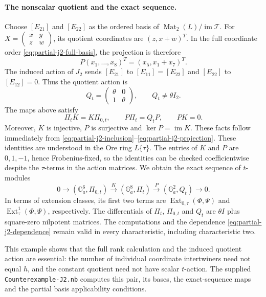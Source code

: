 \paragraph{The nonscalar quotient and the exact sequence.}
Choose $[E_{21}]$ and $[E_{22}]$ as the ordered basis of
$\operatorname{Mat}_2(L)/\operatorname{im}\mathcal T$.
For $X=\begin{pmatrix}x&y\\z&w\end{pmatrix}$, its quotient coordinates
are $(z,x+w)^T$. In the full coordinate order
\eqref{eq:partial-j2-full-basis}, the projection is therefore
\begin{equation}
 P(x_1,\ldots,x_8)^T=(x_5,x_1+x_7)^T.
 \label{eq:partial-j2-projection}
\end{equation}
The induced action of $J_2$ sends
$[E_{21}]$ to $[E_{11}]=[E_{22}]$ and $[E_{22}]$ to
$[E_{12}]=0$. Thus the quotient action is
\begin{equation}
 Q_t=\begin{pmatrix}\theta&0\\1&\theta\end{pmatrix},
 \qquad Q_t\neq\theta I_2.
 \label{eq:partial-j2-quotient}
\end{equation}
The maps above satisfy
\[
 \Pi_tK=K\Pi_{0,t},\qquad P\Pi_t=Q_tP,\qquad PK=0.
\]
Moreover, $K$ is injective, $P$ is surjective and $\ker P=\operatorname{im}K$.
These facts follow immediately from
\eqref{eq:partial-j2-inclusion}--\eqref{eq:partial-j2-projection}.
These identities are understood in the Ore ring $L\{\tau\}$.
The entries of $K$ and $P$ are $0,1,-1$, hence Frobenius-fixed, so the
identities can be checked coefficientwise despite the $\tau$-terms in the
action matrices.
We obtain the exact sequence of $t$-modules
\begin{equation}
 0\longrightarrow(\mathbb G_a^6,\Pi_{0,t})
 \xrightarrow{K}(\mathbb G_a^8,\Pi_t)
 \xrightarrow{P}(\mathbb G_a^2,Q_t)
 \longrightarrow0.
 \label{eq:partial-j2-exact-sequence}
\end{equation}
In terms of extension classes, its first two terms are
$\operatorname{Ext}_{0,\tau}(\Phi,\Psi)$ and
$\operatorname{Ext}^1_\tau(\Phi,\Psi)$, respectively.
The differentials of $\Pi_t$, $\Pi_{0,t}$ and $Q_t$ are $\theta I$
plus square-zero nilpotent matrices.
The computations and the dependence
\eqref{eq:partial-j2-dependence} remain valid in every characteristic,
including characteristic two.

This example shows that the full rank calculation and the induced quotient
action are essential: the number of individual coordinate intertwiners
need not equal $h$, and the constant quotient need not have scalar
$t$-action. The supplied \texttt{Counterexample-J2.nb} computes this pair,
its bases, the exact-sequence maps and the partial basis applicability
conditions.
